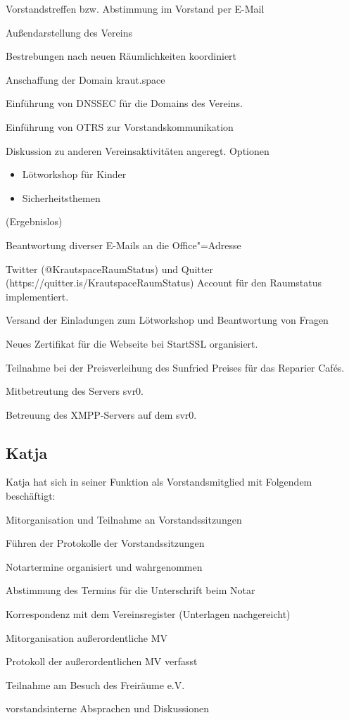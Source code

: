 \documentclass[ngerman]{scrartcl}
\begin{document}
\begin{compactitem}
\item Vorstandstreffen bzw. Abstimmung im Vorstand per E-Mail
\item Außendarstellung des Vereins
\item Bestrebungen nach neuen Räumlichkeiten koordiniert 
\item Anschaffung der Domain kraut.space
\item Einführung von DNSSEC für die Domains des Vereins.
\item Einführung von OTRS zur Vorstandskommunikation
\item Diskussion zu anderen Vereinsaktivitäten angeregt. Optionen
  \begin{itemize}
  \item Lötworkshop für Kinder
  \item Sicherheitsthemen
  \end{itemize} (Ergebnislos)
\item Beantwortung diverser E-Mails an die Office"=Adresse
\item Twitter (@KrautspaceRaumStatus) und Quitter
  (https://quitter.is/KrautspaceRaumStatus) Account für den Raumstatus
  implementiert.
\item Versand der Einladungen zum Lötworkshop und Beantwortung von
  Fragen
\item Neues Zertifikat für die Webseite bei StartSSL organisiert.
\item Teilnahme bei der Preisverleihung des Sunfried Preises für das Reparier Cafés.
\item Mitbetreutung des Servers svr0.
\item Betreuung des XMPP-Servers auf dem svr0.
\end{compactitem}

\subsection{Katja}

Katja hat sich in seiner Funktion als Vorstandsmitglied mit Folgendem 
beschäftigt:

\begin{compactitem}
    \item Mitorganisation und Teilnahme an Vorstandssitzungen
    \item Führen der Protokolle der Vorstandssitzungen
    \item Notartermine organisiert und wahrgenommen
    \item Abstimmung des Termins für die Unterschrift beim Notar
    \item Korrespondenz mit dem Vereinsregister (Unterlagen nachgereicht)
    \item Mitorganisation außerordentliche MV
    \item Protokoll der außerordentlichen MV verfasst
    \item Teilnahme am Besuch des Freiräume e.V.
    \item vorstandsinterne Absprachen und Diskussionen  
\end{compactitem}
\end{document}
